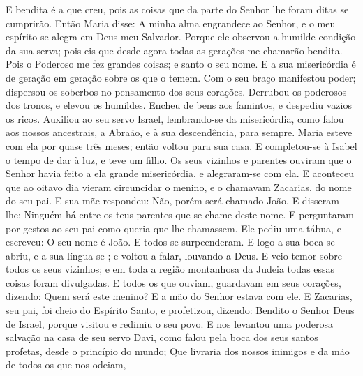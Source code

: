 {  E bendita
 é a que creu, pois as coisas que da parte do Senhor lhe foram ditas se cumprirão.
  Então Maria disse: A minha alma engrandece ao Senhor,
  e o meu espírito se alegra em Deus meu Salvador.
  Porque ele observou a humilde condição da sua serva; pois eis que desde agora todas as gerações me chamarão bendita.
  Pois o Poderoso me fez grandes coisas; e santo
{} o seu nome.
  E a sua misericórdia é de geração em geração sobre os que o temem.
  Com o seu braço manifestou poder; dispersou os soberbos no pensamento dos seus corações.
  Derrubou os poderosos dos tronos, e elevou os humildes.
  Encheu de bens aos famintos, e despediu vazios os ricos.
  Auxiliou ao seu servo Israel, lembrando-se da
{} misericórdia,
  como falou aos nossos ancestrais,
 a Abraão, e à sua descendência,
 para sempre.
  Maria esteve com ela por quase três meses; então voltou para sua casa.
  E completou-se à Isabel o tempo de dar à luz, e teve um filho.
  Os seus vizinhos e parentes ouviram que o Senhor havia feito a ela grande misericórdia, e alegraram-se com ela.
  E aconteceu que ao oitavo dia vieram circuncidar o menino, e o chamavam Zacarias, do nome do seu pai.
  E sua mãe respondeu: Não, porém será chamado João.
  E disseram-lhe: Ninguém há entre os teus parentes que se chame deste nome.
  E perguntaram por gestos ao seu pai como queria que lhe chamassem.
  Ele pediu uma tábua, e escreveu: O seu nome é João. E todos se surpeenderam.
  E logo a sua boca se abriu, e a sua língua se
{} ; e voltou a falar, louvando a Deus.
  E veio temor sobre todos os seus vizinhos; e em toda a região montanhosa da Judeia todas essas coisas foram divulgadas.
  E todos os que ouviam, guardavam em seus corações, dizendo: Quem será este menino? E a mão do Senhor estava com ele.
  E Zacarias, seu pai, foi cheio do Espírito Santo, e profetizou, dizendo:
  Bendito
{} o Senhor Deus de Israel, porque visitou e redimiu o seu povo.
  E nos levantou uma poderosa salvação
 na casa de seu servo Davi,
  como falou pela boca dos seus santos profetas, desde o princípio do mundo;
  Que
{} livraria dos nossos inimigos e da mão de todos os que nos odeiam,
}
